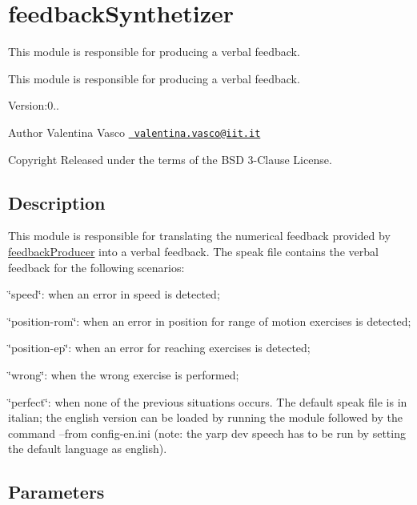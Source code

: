 \section{feedback\+Synthetizer}
\label{group__feedbackSynthetizer}


This module is responsible for producing a verbal feedback.  


This module is responsible for producing a verbal feedback. 

Version\+:0.. \begin{DoxyAuthor}{Author}
Valentina Vasco \href{mailto:valentina.vasco@iit.it}{\texttt{ valentina.\+vasco@iit.\+it}} ~\newline
 
\end{DoxyAuthor}
\begin{DoxyCopyright}{Copyright}
Released under the terms of the B\+SD 3-\/Clause License. 
\end{DoxyCopyright}
\hypertarget{group__skeletonViewer_intro_sec}{}\subsection{Description}\label{group__skeletonViewer_intro_sec}
This module is responsible for translating the numerical feedback provided by \mbox{\hyperlink{group__feedbackProducer}{feedback\+Producer}} into a verbal feedback. The speak file contains the verbal feedback for the following scenarios\+:
\begin{DoxyItemize}
\item \char`\"{}speed\char`\"{}\+: when an error in speed is detected;
\item \char`\"{}position-\/rom\char`\"{}\+: when an error in position for range of motion exercises is detected;
\item \char`\"{}position-\/ep\char`\"{}\+: when an error for reaching exercises is detected;
\item \char`\"{}wrong\char`\"{}\+: when the wrong exercise is performed;
\item \char`\"{}perfect\char`\"{}\+: when none of the previous situations occurs. The default speak file is in italian; the english version can be loaded by running the module followed by the command --from config-\/en.\+ini (note\+: the yarp dev speech has to be run by setting the default language as english).
\end{DoxyItemize}\hypertarget{group__skeletonViewer_parameters_sec}{}\subsection{Parameters}\label{group__skeletonViewer_parameters_sec}

